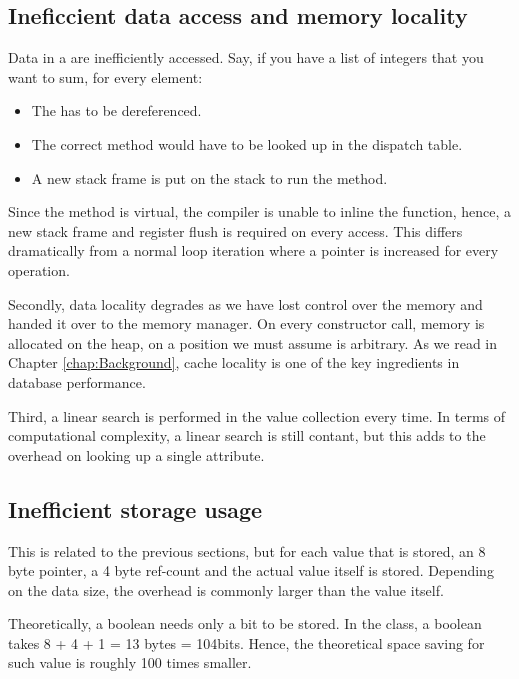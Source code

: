 \subsection{Ineficcient data access and memory locality}
\label{sub:Ineficcient data access and memory locality}
Data in a  are inefficiently accessed. Say, if you have a list of  integers that you want to sum, for every element:
\begin{itemize}
    \item The  has to be dereferenced.
    \item The correct  method would have to be looked up in the dispatch table.
    \item A new stack frame is put on the stack to run the  method.
\end{itemize}
Since the method is virtual, the compiler is unable to inline the function, hence, a new stack frame and register flush is required on every access. This differs dramatically from a normal loop iteration where a pointer is increased for every operation.

Secondly, data locality degrades as we have lost control over the memory and handed it over to the memory manager. On every constructor call, memory is allocated on the heap, on a position we must assume is arbitrary. As we read in Chapter \ref{chap:Background}, cache locality is one of the key ingredients in database performance.

Third, a linear search is performed in the value collection every time. In terms of computational complexity, a linear search is still contant, but this adds to the overhead on looking up a single attribute.

\subsection{Inefficient storage usage}
\label{sub:Inefficient storage usage}
This is related to the previous sections, but for each value that is stored, an 8 byte pointer, a 4 byte ref-count and the actual value itself is stored. Depending on the data size, the overhead is commonly larger than the value itself.

Theoretically, a boolean needs only a bit to be stored. In the  class, a boolean takes 8 + 4 + 1 = 13 bytes = 104bits. Hence, the theoretical space saving for such value is roughly 100 times smaller.

